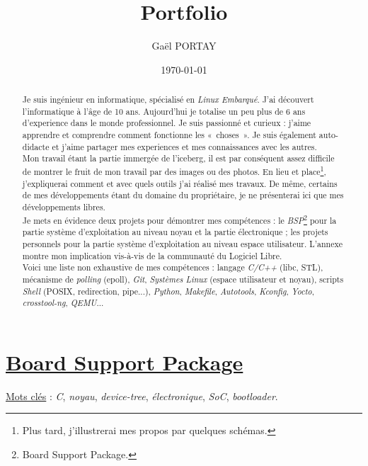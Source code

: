 \documentclass[a4paper]{article}
\title{Portfolio}
\author{Gaël PORTAY}
\date{\today}
\begin{document}
\sloppy
\maketitle

\begin{abstract}
Je suis ingénieur en informatique, spécialisé en \textit{Linux Embarqué}. J'ai découvert l'informatique à l'âge de 10 ans. Aujourd'hui je totalise un peu plus de 6 ans d'experience dans le monde professionnel. Je suis passionné et curieux : j'aime apprendre et comprendre comment fonctionne les «~choses~». Je suis également auto-didacte et j'aime partager mes experiences et mes connaissances avec les autres.\\

Mon travail étant la partie immergée de l'iceberg, il est par conséquent assez difficile de montrer le fruit de mon travail par des images ou des photos. En lieu et place\footnote{Plus tard, j'illustrerai mes propos par quelques schémas.}, j'expliquerai comment et avec quels outils j'ai réalisé mes travaux. De même, certains de mes développements étant du domaine du propriétaire, je ne présenterai ici que mes développements libres.\\

Je mets en évidence deux projets pour démontrer mes compétences : le \textit{BSP}\footnote{Board Support Package.} pour la partie système d'exploitation au niveau noyau et la partie électronique ; les projets personnels pour la partie système d'exploitation au niveau espace utilisateur. L'annexe montre mon implication vis-à-vis de la communauté du Logiciel Libre.\\

Voici une liste non exhaustive de mes compétences : langage \textit{C/C++} (libc, STL), mécanisme de \textit{polling} (epoll), \textit{Git}, \textit{Systèmes Linux} (espace utilisateur et noyau), scripts \textit{Shell} (POSIX, redirection, pipe...), \textit{Python}, \textit{Makefile}, \textit{Autotools}, \textit{Kconfig}, \textit{Yocto}, \textit{crosstool-ng}, \textit{QEMU}...
\end{abstract}
\clearpage

\tableofcontents
\clearpage

\part{\href{https://fr.wikipedia.org/wiki/Board_support_package}{Board Support Package}}

\underline{Mots clés} : \textit{C}, \textit{noyau}, \textit{device-tree}, \textit{électronique}, \textit{SoC}, \textit{bootloader}.\\
\end{document}
